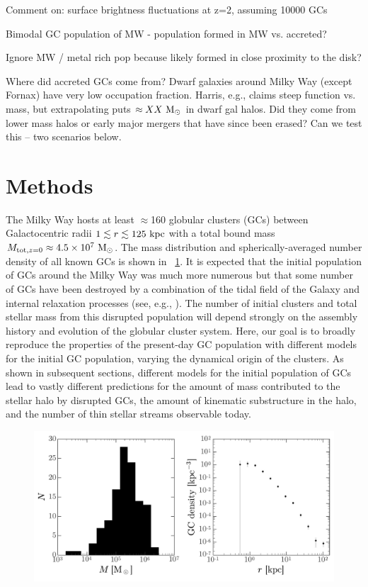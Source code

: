 \documentclass[manuscript, letterpaper]{aastex6}
\begin{document}

Comment on: surface brightness fluctuations at z=2, assuming 10000 GCs

Bimodal GC population of MW - population formed in MW vs. accreted?

Ignore MW / metal rich pop because likely formed in close proximity to the disk?

Where did accreted GCs come from? Dwarf galaxies around Milky Way (except
Fornax) have very low occupation fraction. Harris, e.g., claims steep function
vs. mass, but extrapolating puts $\approx XX~\mathrm{M}_\odot$ in dwarf gal halos. Did they
come from lower mass halos or early major mergers that have since been erased?
Can we test this -- two scenarios below.

\section{Methods}\label{sec:methods}

The Milky Way hosts at least $\approx$160 globular clusters (GCs) between
Galactocentric radii $1 \lesssim r \lesssim 125~\mathrm{kpc}$ with a total bound mass
$M_{{\rm tot},z=0} \approx 4.5 \times 10^7~\mathrm{M}_\odot$.
The mass distribution and spherically-averaged number density of all known GCs
is shown in \figname~\ref{fig:mw-gc-pop}.
It is expected that the initial population of GCs around the Milky Way was much
more numerous but that some number of GCs have been destroyed by a combination
of the tidal field of the Galaxy and internal relaxation processes (see, e.g.,
\citealt{Gnedin:1997}).
The number of initial clusters and total stellar mass from this disrupted
population will depend strongly on the assembly history and evolution of the
globular cluster system.
Here, our goal is to broadly reproduce the properties of the present-day GC
population with different models for the initial GC population, varying the
dynamical origin of the clusters.
As shown in subsequent sections, different models for the initial population of
GCs lead to vastly different predictions for the amount of mass contributed to
the stellar halo by disrupted GCs, the amount of kinematic substructure in the
halo, and the number of thin stellar streams observable today.

\begin{figure}[h]
\begin{center}
\includegraphics[width=\textwidth]{figures/mass-gcdensity.pdf}
\end{center}
\caption{%
\label{fig:mw-gc-pop}}
\end{figure}
\end{document}
